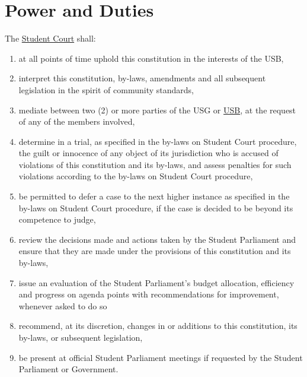 \protect{}\label{art:judicative}
\protect\section{Power and Duties}
The \hyperref[StudentCourtDef]{Student Court} shall:
\protect\begin{enumerate}
	\item at all points of time uphold this constitution in the interests of the USB,
	\item interpret this constitution, by-laws, amendments and all subsequent legislation in the spirit of community standards,
	\item mediate between two (2) or more parties of the USG or \hyperref[studentbody]{USB}, at the request of any of
	the members involved,
	\item determine in a trial, as specified in the by-laws on Student Court procedure, the guilt or
	innocence of any object of its jurisdiction who is accused of violations of this constitution
	and its by-laws, and assess penalties for such violations according to the by-laws on
	Student Court procedure,
	\item  be permitted to defer a case to the next higher instance as specified in the by-laws on
	Student Court procedure, if the case is decided to be beyond its competence to judge,
	\item review the decisions made and actions taken by the Student Parliament and ensure that
	they are made under the provisions of this constitution and its by-laws,
	\item issue an evaluation of the Student Parliament's budget allocation, efficiency and
	progress on agenda points with recommendations for improvement, whenever asked to do so
	\item recommend, at its discretion, changes in or additions to this constitution, its by-laws, or
	subsequent legislation,
	\item be present at official Student Parliament meetings if requested by the Student Parliament
	or Government. 
\end{enumerate}

